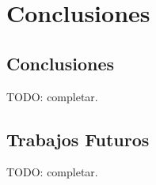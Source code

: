 \chapter{Conclusiones}

\label{Chapter5}

\section{Conclusiones}

TODO: completar. \lipsum[1]

\section{Trabajos Futuros}

TODO: completar. \lipsum[1]